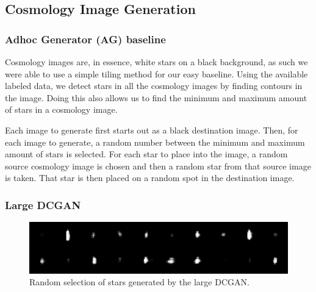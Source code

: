\documentclass[10pt,conference,compsocconf]{IEEEtran}
\begin{document}



\subsection{Cosmology Image Generation}

\subsubsection{Adhoc Generator (AG) baseline} %
Cosmology images are, in essence, white stars on a black background, as such we were able to use a simple tiling method for our easy baseline. Using the available labeled data, we detect stars in all the cosmology images by finding contours in the image. Doing this also allows us to find the minimum and maximum amount of stars in a cosmology image. 

Each image to generate first starts out as a black destination image. Then, for each image to generate, a random number between the minimum and maximum amount of stars is selected. For each star to place into the image, a random source cosmology image is chosen and then a random star from that source image is taken. That star is then placed on a random spot in the destination image.

\subsubsection{Large DCGAN}

\begin{figure}[ht]
    \centering
    \includegraphics[width=\columnwidth]{assets/star_ensemble_large_resized.png}
    \caption{Random selection of stars generated by the large DCGAN.}
    \label{fig:dcgan_stars}
\end{figure}
\end{document}
